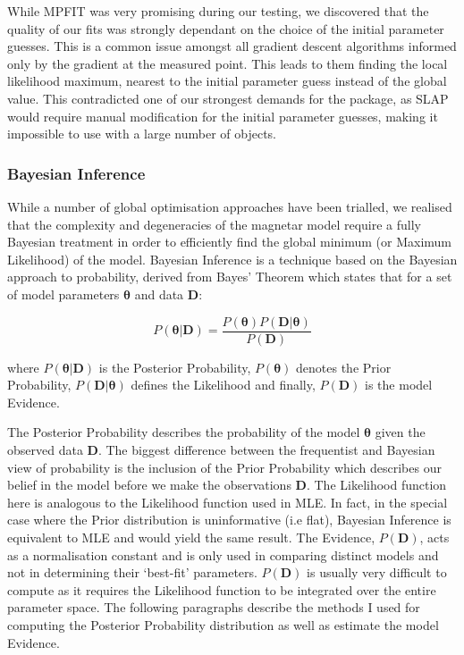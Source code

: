 While \textsc{MPFIT} was very promising during our testing, we discovered that the quality of our fits was strongly dependant on the choice of the initial parameter guesses. This is a common issue amongst all gradient descent algorithms informed only by the gradient at the measured point. This leads to them finding the local likelihood maximum, nearest to the initial parameter guess instead of the global value. This contradicted one of our strongest demands for the package, as \textsc{SLAP} would require manual modification for the initial parameter guesses, making it impossible to use with a large number of objects.

\subsubsection{Bayesian Inference}
While a number of global optimisation approaches have been trialled, we realised that the complexity and degeneracies of the magnetar model require a fully Bayesian treatment in order to efficiently find the global minimum (or Maximum Likelihood) of the model. Bayesian Inference is a technique based on the Bayesian approach to probability, derived from Bayes' Theorem which states that for a set of model parameters $\mathbf{\theta}$ and data $\mathbf{D}$:

\begin{equation}
  P(\mathbf{\theta}|\mathbf{D}) = \frac{P(\mathbf{\theta}) P(\mathbf{D}|\mathbf{\theta})}{P(\mathbf{D})}
\end{equation}

\noindent where $P(\mathbf{\theta}|\mathbf{D})$ is the Posterior Probability, $P(\mathbf{\theta})$ denotes the Prior Probability, $P(\mathbf{D}|\mathbf{\theta})$ defines the Likelihood and finally, $P(\mathbf{D})$ is the model Evidence.

The Posterior Probability describes the probability of the model $\mathbf{\theta}$ given the observed data $\mathbf{D}$. The biggest difference between the frequentist and Bayesian view of probability is the inclusion of the Prior Probability which describes our belief in the model before we make the observations $\textbf{D}$. The Likelihood function here is analogous to the Likelihood function used in MLE. In fact, in the special case where the Prior distribution is uninformative (i.e flat), Bayesian Inference is equivalent to MLE and would yield the same result. The Evidence, $P(\mathbf{D})$, acts as a normalisation constant and is only used in comparing distinct models and not in determining their `best-fit' parameters. $P(\mathbf{D})$ is usually very difficult to compute as it requires the Likelihood function to be integrated over the entire parameter space. The following paragraphs describe the methods I used for computing the Posterior Probability distribution as well as estimate the model Evidence.

